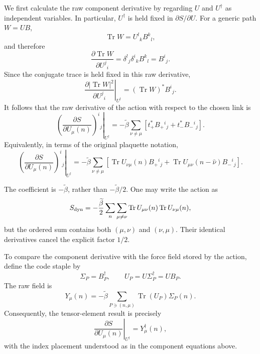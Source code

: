 We first calculate the raw component derivative by regarding $U$ and
$U^\dagger$ as independent variables.  In particular, $U^\dagger$ is held
fixed in $\partial S/\partial U$.  For a generic path $W=UB$,
\begin{equation}
\operatorname{Tr}W=U^l{}_k B^k{}_l,
\end{equation}
and therefore
\begin{equation}
\frac{\partial\operatorname{Tr}W}{\partial U^j{}_i}
=\delta^l{}_j\delta^i{}_k B^k{}_l
=B^i{}_j.
\end{equation}
Since the conjugate trace is held fixed in this raw derivative,
\begin{equation}
\left.
\frac{\partial |\operatorname{Tr}W|^2}{\partial U^j{}_i}
\right|_{U^\dagger}
=(\operatorname{Tr}W)^*B^i{}_j.
\end{equation}
It follows that the raw derivative of the action with respect to the chosen
link is
\begin{equation}
\boxed{
\left.
\left(\frac{\partial S}{\partial U_\mu(n)}\right)^i{}_j
\right|_{U^\dagger}
=-\widetilde\beta\sum_{\nu\ne\mu}
\left[t_{+}^* B_{+}{}^i{}_j+t_{-}^* B_{-}{}^i{}_j\right].
}
\end{equation}
Equivalently, in terms of the original plaquette notation,
\begin{equation}
\boxed{
\left.
\left(\frac{\partial S}{\partial U_\mu(n)}\right)^i{}_j
\right|_{U^\dagger}
=-\widetilde\beta\sum_{\nu\ne\mu}
\left[
\operatorname{Tr}U_{\nu\mu}(n)B_{+}{}^i{}_j
+\operatorname{Tr}U_{\mu\nu}(n-\hat\nu)B_{-}{}^i{}_j
\right].
}
\end{equation}

The coefficient is $-\widetilde\beta$, rather than
$-\widetilde\beta/2$.  One may write the action as
\begin{equation}
S_{\rm dyn}=-\frac{\widetilde\beta}{2}
\sum_n\sum_{\mu\ne\nu}
\operatorname{Tr}U_{\mu\nu}(n)\operatorname{Tr}U_{\nu\mu}(n),
\end{equation}
but the ordered sum contains both $(\mu,\nu)$ and $(\nu,\mu)$.  Their
identical derivatives cancel the explicit factor $1/2$.

To compare the component derivative with the force field stored by the
action, define the code staple by
\begin{equation}
\Sigma_P=B_P^\dagger,
\qquad U_P=U\Sigma_P^\dagger=UB_P.
\end{equation}
The raw field is
\begin{equation}
Y_\mu(n)=-\widetilde\beta\sum_{P\ni(n,\mu)}
\operatorname{Tr}(U_P)\Sigma_P(n).
\end{equation}
Consequently, the tensor-element result is precisely
\begin{equation}
\boxed{
\left.\frac{\partial S}{\partial U_\mu(n)}\right|_{U^\dagger}
=Y_\mu^\dagger(n),
}
\end{equation}
with the index placement understood as in the component equations above.

